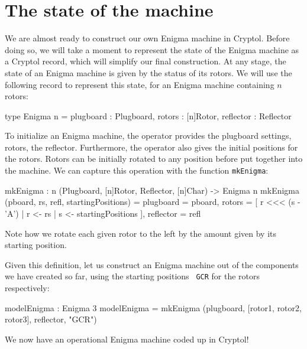 \section{The state of the machine}
\label{sec:state-machine}

We are almost ready to construct our own Enigma machine in
Cryptol. Before doing so, we will take a moment to represent the state
of the Enigma machine as a Cryptol record\indTheRecordType, which will
simplify our final construction. At any stage, the state of an Enigma
machine is given by the status of its rotors. We will use the
following record to represent this state, for an Enigma machine
containing $n$ rotors:
\begin{code}
  type Enigma n = { plugboard : Plugboard,
                    rotors    : [n]Rotor,
                    reflector : Reflector
                  }
\end{code}
To initialize an Enigma machine, the operator provides the plugboard
settings, rotors, the reflector. Furthermore, the operator also gives
the initial positions for the rotors.  Rotors can be initially rotated
to any position before put together into the machine. We can capture
this operation with the function {\tt mkEnigma}:
\begin{code}
  mkEnigma : {n} (Plugboard, [n]Rotor, Reflector, [n]Char) 
                 -> Enigma n
  mkEnigma (pboard, rs, refl, startingPositions) =
      { plugboard  = pboard,
        rotors     = [ r <<< (s - 'A')
                     | r <- rs
                     | s <- startingPositions
                     ],
        reflector  = refl
      }
\end{code}
Note how we rotate each given rotor to the left by the amount given by
its starting position.


Given this definition, let us construct an Enigma machine out of the
components we have created so far, using the starting positions {\tt
  GCR} for the rotors respectively:\label{def:modelEnigma}
\begin{code}
  modelEnigma : Enigma 3
  modelEnigma = mkEnigma (plugboard, [rotor1, rotor2, rotor3], 
                          reflector, "GCR")
\end{code}
We now have an operational Enigma machine coded up in Cryptol!


